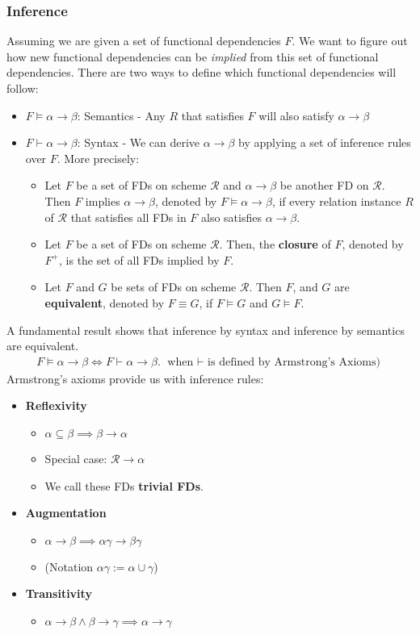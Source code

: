 \subsubsection{Inference}
Assuming we are given a set of functional dependencies $F$. We want to figure out how new functional dependencies can be \textit{implied} from this set of functional dependencies. There are two ways to define which functional dependencies will follow:
\begin{itemize}
\item $F \models \alpha \to \beta$: Semantics - Any $R$ that satisfies $F$ will also satisfy $\alpha \to \beta$
\item $F \vdash \alpha \to \beta$: Syntax - We can derive $\alpha \to \beta$ by applying a set of inference rules over $F$.
More precisely:
\begin{itemize}
\item Let $F$ be a set of FDs on scheme $\mathcal{R}$ and $\alpha \to \beta$ be another FD on $\mathcal{R}$. Then $F$ implies $\alpha \to \beta$, denoted by $F \models \alpha \to \beta$, if every relation instance $R$ of $\mathcal{R}$ that satisfies all FDs in $F$ also satisfies $\alpha \to \beta$.
\item Let $F$ be a set of FDs on scheme $\mathcal{R}$. Then, the \textbf{closure} of $F$, denoted by $F^+$, is the set of all FDs implied by $F$.
\item Let $F$ and $G$ be sets of FDs on scheme $\mathcal{R}$. Then $F$, and $G$ are \textbf{equivalent}, denoted by $F \equiv G$, if $F \models G$ and $G \models F$.
\end{itemize}
\end{itemize}
A fundamental result shows that inference by syntax and inference by semantics are equivalent.
\begin{align*}
F \models \alpha \to \beta \iff F \vdash \alpha \to \beta. \text{ when $\vdash$ is defined by Armstrong's Axioms)}
\end{align*}
Armstrong's axioms provide us with inference rules:
\begin{itemize}
\item \textbf{Reflexivity}
\begin{itemize}
\item $\alpha \subseteq \beta \implies \beta \to \alpha$
\item Special case: $\mathcal{R} \to \alpha$
\item We call these FDs \textbf{trivial FDs}.
\end{itemize}
\item \textbf{Augmentation}
\begin{itemize}
\item $\alpha \to \beta \implies \alpha\gamma \to \beta\gamma$
\item (Notation $\alpha\gamma := \alpha \cup \gamma$)
\end{itemize}
\item \textbf{Transitivity}
\begin{itemize}
\item $\alpha \to \beta \land \beta \to \gamma \implies \alpha \to \gamma$
\end{itemize}
\end{itemize}

